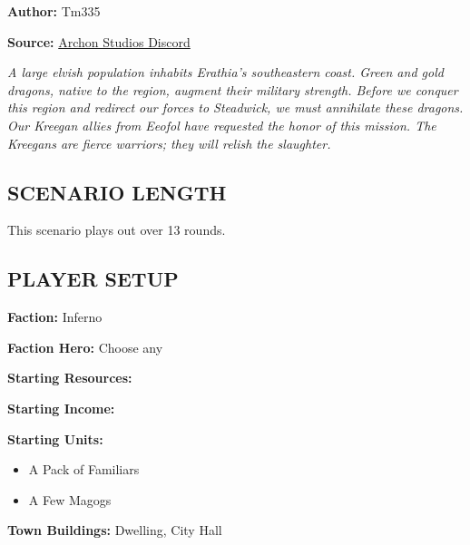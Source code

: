 \cleardoublepage{}

\begin{multicols*}{2}

\textbf{Author:} Tm335

\textbf{Source:} \href{https://discord.com/channels/740870068178649108/1243057664666238996/1243057664666238996}{Archon Studios Discord}

\textit{A large elvish population inhabits Erathia's southeastern coast.
  Green and gold dragons, native to the region, augment their military strength.
  Before we conquer this region and redirect our forces to Steadwick, we must annihilate these dragons.
  Our Kreegan allies from Eeofol have requested the honor of this mission.
  The Kreegans are fierce warriors; they will relish the slaughter.}

\subsection*{\MakeUppercase{Scenario length}}

This scenario plays out over 13 rounds.

\subsection*{\MakeUppercase{Player setup}}

\textbf{Faction:} Inferno

\textbf{Faction Hero:} Choose any

\textbf{Starting Resources:}\par
{}

\textbf{Starting Income:}\par
{}

\textbf{Starting Units:}

\begin{itemize}
  \item A Pack of Familiars
  \item A Few Magogs
\end{itemize}

\textbf{Town Buildings:}  Dwelling, City Hall

\vspace*{\fill}\columnbreak


\end{multicols*}
